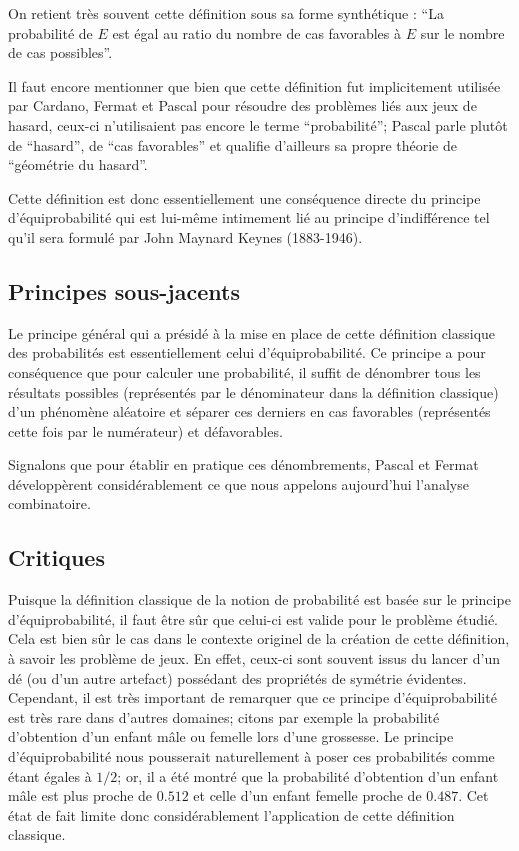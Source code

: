 \documentclass[11pt,a4paper]{article}
\begin{document}
On retient très souvent cette définition sous sa forme synthétique : ``La probabilité de $E$ est égal au ratio du nombre de cas favorables à $E$ sur le nombre de cas possibles''.

Il faut encore mentionner que bien que cette définition fut implicitement utilisée par Cardano, Fermat et Pascal pour résoudre des problèmes liés aux jeux de hasard, ceux-ci n'utilisaient pas encore le terme ``probabilité''; Pascal parle plutôt de ``hasard'', de ``cas favorables'' et qualifie d'ailleurs sa propre théorie de ``géométrie du hasard''.

Cette définition est donc essentiellement une conséquence directe du principe d'équiprobabilité qui est lui-même intimement lié au principe d'indifférence tel qu'il sera formulé par John Maynard Keynes (1883-1946).

\subsection{Principes sous-jacents}

Le principe général qui a présidé à la mise en place de cette définition classique des probabilités est essentiellement celui d'équiprobabilité. Ce principe a pour conséquence que pour calculer une probabilité, il suffit de dénombrer tous les résultats possibles (représentés par le dénominateur dans la définition classique) d'un phénomène aléatoire et séparer ces derniers en cas favorables (représentés cette fois par le numérateur) et défavorables.

Signalons que pour établir en pratique ces dénombrements, Pascal et Fermat développèrent considérablement ce que nous appelons aujourd'hui l'analyse combinatoire.

\subsection{Critiques}

Puisque la définition classique de la notion de probabilité est basée sur le principe d'équiprobabilité, il faut être sûr que celui-ci est valide pour le problème étudié. Cela est bien sûr le cas dans le contexte originel de la création de cette définition, à savoir les problème de jeux. En effet, ceux-ci sont souvent issus du lancer d'un dé (ou d'un autre artefact) possédant des propriétés de symétrie évidentes. Cependant, il est très important de remarquer que ce principe d'équiprobabilité est très rare dans d'autres domaines; citons par exemple la probabilité d'obtention d'un enfant mâle ou femelle lors d'une grossesse. Le principe d'équiprobabilité nous pousserait naturellement à poser ces probabilités comme étant égales à $1/2$; or, il a été montré que la probabilité d'obtention d'un enfant mâle est plus proche de $0.512$ et celle d'un enfant femelle proche de $0.487$. Cet état de fait limite donc considérablement l'application de cette définition classique.
\end{document}
